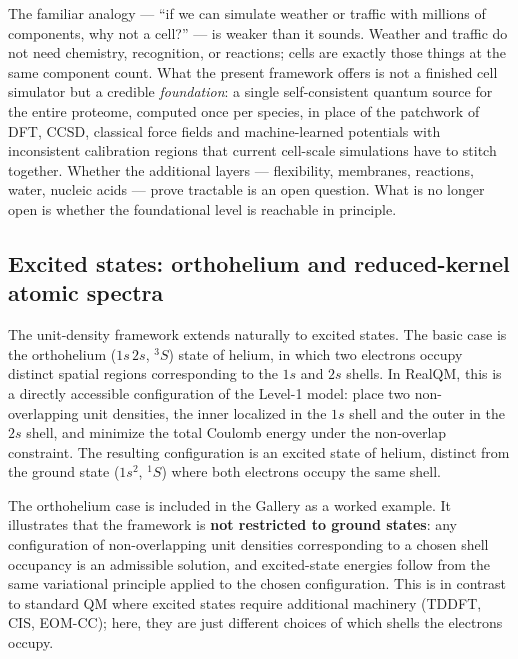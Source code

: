 \documentclass[11pt]{article}
\begin{document}
The familiar analogy --- ``if we can simulate weather or traffic with millions of components, why not a cell?'' --- is weaker than it sounds. Weather and traffic do not need chemistry, recognition, or reactions; cells are exactly those things at the same component count. What the present framework offers is not a finished cell simulator but a credible \emph{foundation}: a single self-consistent quantum source for the entire proteome, computed once per species, in place of the patchwork of DFT, CCSD, classical force fields and machine-learned potentials with inconsistent calibration regions that current cell-scale simulations have to stitch together. Whether the additional layers --- flexibility, membranes, reactions, water, nucleic acids --- prove tractable is an open question. What is no longer open is whether the foundational level is reachable in principle.

\subsection{Excited states: orthohelium and reduced-kernel atomic spectra}\label{sec:orthohelium}

The unit-density framework extends naturally to excited states. The basic case is the orthohelium ($1s\,2s$, $^3S$) state of helium, in which two electrons occupy distinct spatial regions corresponding to the $1s$ and $2s$ shells. In RealQM, this is a directly accessible configuration of the Level-1 model: place two non-overlapping unit densities, the inner localized in the $1s$ shell and the outer in the $2s$ shell, and minimize the total Coulomb energy under the non-overlap constraint. The resulting configuration is an excited state of helium, distinct from the ground state ($1s^2$, $^1S$) where both electrons occupy the same shell.

The orthohelium case is included in the Gallery as a worked example. It illustrates that the framework is \textbf{not restricted to ground states}: any configuration of non-overlapping unit densities corresponding to a chosen shell occupancy is an admissible solution, and excited-state energies follow from the same variational principle applied to the chosen configuration. This is in contrast to standard QM where excited states require additional machinery (TDDFT, CIS, EOM-CC); here, they are just different choices of which shells the electrons occupy.
\end{document}
